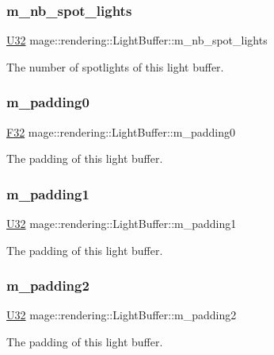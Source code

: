 \subsubsection{\texorpdfstring{m\+\_\+nb\+\_\+spot\+\_\+lights}{m\_nb\_spot\_lights}}
{\footnotesize\ttfamily \hyperlink{namespacemage_a41c104c036fba3756a74e19f793eeaa1}{U32} mage\+::rendering\+::\+Light\+Buffer\+::m\+\_\+nb\+\_\+spot\+\_\+lights}

The number of spotlights of this light buffer. \hypertarget{structmage_1_1rendering_1_1_light_buffer_af394a013358f2a867827474e4ba283ba}{}\label{structmage_1_1rendering_1_1_light_buffer_af394a013358f2a867827474e4ba283ba} 
\subsubsection{\texorpdfstring{m\+\_\+padding0}{m\_padding0}}
{\footnotesize\ttfamily \hyperlink{namespacemage_aa97e833b45f06d60a0a9c4fc22ae02c0}{F32} mage\+::rendering\+::\+Light\+Buffer\+::m\+\_\+padding0}

The padding of this light buffer. \hypertarget{structmage_1_1rendering_1_1_light_buffer_a09c3c5f0cd03d1786512403f376cc674}{}\label{structmage_1_1rendering_1_1_light_buffer_a09c3c5f0cd03d1786512403f376cc674} 
\subsubsection{\texorpdfstring{m\+\_\+padding1}{m\_padding1}}
{\footnotesize\ttfamily \hyperlink{namespacemage_a41c104c036fba3756a74e19f793eeaa1}{U32} mage\+::rendering\+::\+Light\+Buffer\+::m\+\_\+padding1}

The padding of this light buffer. \hypertarget{structmage_1_1rendering_1_1_light_buffer_a17176d3ad7b23f398e6e8e2c16fc58e2}{}\label{structmage_1_1rendering_1_1_light_buffer_a17176d3ad7b23f398e6e8e2c16fc58e2} 
\subsubsection{\texorpdfstring{m\+\_\+padding2}{m\_padding2}}
{\footnotesize\ttfamily \hyperlink{namespacemage_a41c104c036fba3756a74e19f793eeaa1}{U32} mage\+::rendering\+::\+Light\+Buffer\+::m\+\_\+padding2}

The padding of this light buffer. 